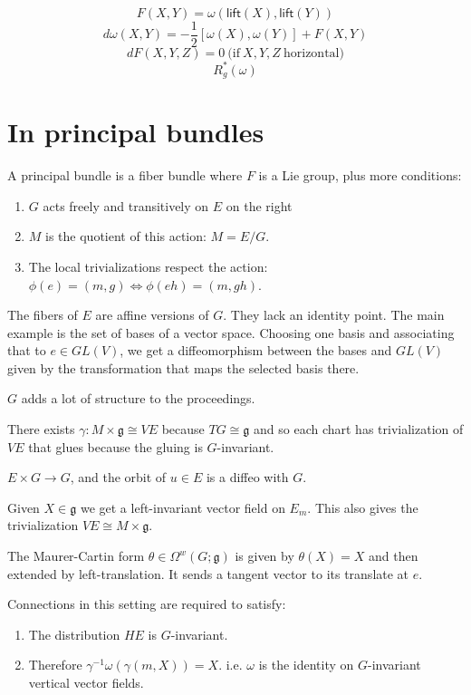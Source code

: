 \documentclass[12pt]{article}
\newcommand{\lift}{\ensuremath{\textsf{lift}}}
\begin{document}
$$F(X, Y) = \omega(\lift(X), \lift(Y))$$
$$d\omega(X, Y) = -\frac{1}{2}[\omega(X), \omega(Y)] + F(X, Y)$$
$$dF(X, Y, Z) = 0 \mathrm{\ (if\ }X, Y, Z\mathrm{\ horizontal)}$$
$$R^*_g(\omega)$$

\section{In principal bundles}
A principal bundle is a fiber bundle where $F$ is a Lie group, plus more conditions:
\begin{enumerate}
    \item $G$ acts freely and transitively on $E$ on the right
	\item $M$ is the quotient of this action: $M=E/G$.
    \item The local trivializations respect the action: $\phi(e) = (m, g)\iff \phi(eh) = (m, gh)$.
\end{enumerate}

The fibers of $E$ are affine versions of $G$. They lack an identity point. The main example is the set of bases of a vector space. Choosing one basis and associating that to $e\in GL(V)$, we get a diffeomorphism between the bases and $GL(V)$ given by the transformation that maps the selected basis there.

$G$ adds a lot of structure to the proceedings.

There exists $\gamma:M\times\mathfrak{g}\cong VE$ because $TG\cong\mathfrak{g}$ and so each chart has trivialization of $VE$ that glues because the gluing is $G$-invariant.

$E\times G \to G$, and the orbit of $u\in E$ is a diffeo with $G$.

Given $X\in\mathfrak{g}$ we get a left-invariant vector field on $E_m$. This also gives the trivialization $VE\cong M\times\mathfrak{g}$.

The Maurer-Cartin form $\theta\in\Omega^w(G;\mathfrak{g})$ is given by $\theta(X)=X$ and then extended by left-translation. It sends a tangent vector to its translate at $e$.

Connections in this setting are required to satisfy:
\begin{enumerate}
	\item The distribution $HE$ is $G$-invariant.
	\item Therefore $\gamma^{-1}\omega(\gamma(m, X)) = X$. i.e. $\omega$ is the identity on $G$-invariant vertical vector fields.
\end{enumerate}
\end{document}
